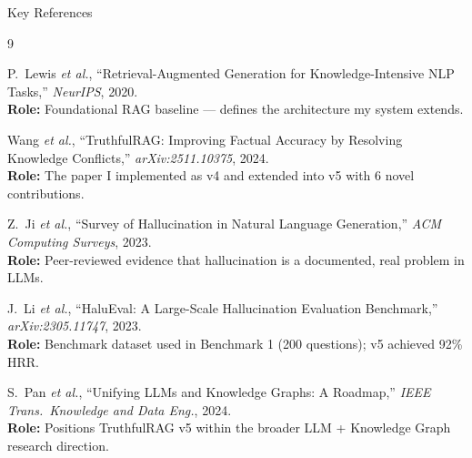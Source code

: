 \documentclass[aspectratio=169, 10pt]{beamer}
\begin{document}
\begin{frame}{Key References}

  \scriptsize
  \begin{thebibliography}{9}

    P.~Lewis \textit{et al.},
    ``Retrieval-Augmented Generation for Knowledge-Intensive NLP Tasks,''
    \textit{NeurIPS}, 2020.\\
    \textcolor{iiitblue}{\textbf{Role:}} Foundational RAG baseline —
    defines the architecture my system extends.

    \vspace{4pt}
    Wang \textit{et al.},
    ``TruthfulRAG: Improving Factual Accuracy by Resolving Knowledge Conflicts,''
    \textit{arXiv:2511.10375}, 2024.\\
    \textcolor{iiitblue}{\textbf{Role:}} The paper I implemented as v4 and
    extended into v5 with 6 novel contributions.

    \vspace{4pt}
    Z.~Ji \textit{et al.},
    ``Survey of Hallucination in Natural Language Generation,''
    \textit{ACM Computing Surveys}, 2023.\\
    \textcolor{iiitblue}{\textbf{Role:}} Peer-reviewed evidence that
    hallucination is a documented, real problem in LLMs.

    \vspace{4pt}
    J.~Li \textit{et al.},
    ``HaluEval: A Large-Scale Hallucination Evaluation Benchmark,''
    \textit{arXiv:2305.11747}, 2023.\\
    \textcolor{iiitblue}{\textbf{Role:}} Benchmark dataset used in
    Benchmark 1 (200 questions); v5 achieved 92\% HRR.

    \vspace{4pt}
    S.~Pan \textit{et al.},
    ``Unifying LLMs and Knowledge Graphs: A Roadmap,''
    \textit{IEEE Trans.\ Knowledge and Data Eng.}, 2024.\\
    \textcolor{iiitblue}{\textbf{Role:}} Positions TruthfulRAG v5 within
    the broader LLM + Knowledge Graph research direction.

  \end{thebibliography}

\end{frame}
\end{document}
